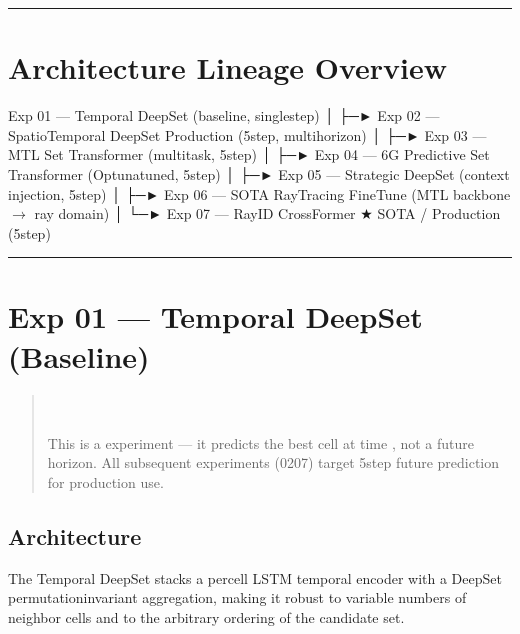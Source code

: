 \documentclass[letterpaper,10pt,english]{sphinxmanual}
\begin{document}
\bigskip\hrule\bigskip



\section{Architecture Lineage Overview}
\label{\detokenize{architecture:architecture-lineage-overview}}
\begin{sphinxVerbatim}[commandchars=\\\{\}]
Exp 01 — Temporal DeepSet (baseline, single\PYGZhy{}step)
      │
      ├─► Exp 02 — SpatioTemporal DeepSet Production (5\PYGZhy{}step, multi\PYGZhy{}horizon)
      │
      ├─► Exp 03 — MTL Set Transformer (multi\PYGZhy{}task, 5\PYGZhy{}step)
      │
      ├─► Exp 04 — 6G Predictive Set Transformer (Optuna\PYGZhy{}tuned, 5\PYGZhy{}step)
      │
      ├─► Exp 05 — Strategic DeepSet (context injection, 5\PYGZhy{}step)
      │
      ├─► Exp 06 — SOTA Ray\PYGZhy{}Tracing Fine\PYGZhy{}Tune (MTL backbone \(\rightarrow\) ray domain)
      │
      └─► Exp 07 — Ray\PYGZhy{}ID CrossFormer ★ SOTA / Production (5\PYGZhy{}step)
\end{sphinxVerbatim}


\bigskip\hrule\bigskip



\section{Exp 01 — Temporal DeepSet (Baseline)}
\label{\detokenize{architecture:exp-01-temporal-deepset-baseline}}\begin{quote}

\sphinxAtStartPar
{} \\
 \\
 This is a  experiment — it predicts the best cell at time , not a future horizon. All subsequent experiments (02\textendash{}07) target 5\sphinxhyphen{}step future prediction for production use.
\end{quote}


\subsection{Architecture}
\label{\detokenize{architecture:architecture}}
\sphinxAtStartPar
The Temporal DeepSet stacks a per\sphinxhyphen{}cell LSTM temporal encoder with a DeepSet permutation\sphinxhyphen{}invariant aggregation, making it robust to variable numbers of neighbor cells and to the arbitrary ordering of the candidate set.
\end{document}
